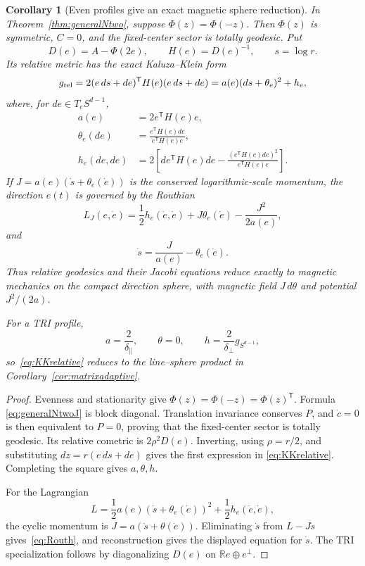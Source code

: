 \documentclass[11pt]{article}
\newtheorem{corollary}{Corollary}
\newcommand{\R}{\mathbb{R}}
\begin{document}
\begin{corollary}[Even profiles give an exact magnetic sphere reduction]
\label{cor:magneticreduction}
In Theorem~\ref{thm:generalNtwo}, suppose \(\Phi(z)=\Phi(-z)\).  Then
\(\Phi(z)\) is symmetric, \(C=0\), and the fixed-center sector is totally
geodesic.  Put
\[
 D(e)=A-\Phi(2e),\qquad H(e)=D(e)^{-1},\qquad s=\log r.
\]
Its relative metric has the exact Kaluza--Klein form
\begin{equation}
 g_{\rm rel}
 =2(e\,ds+de)^{\mathsf T}H(e)(e\,ds+de)
 =a(e)(ds+\theta_e)^2+h_e,
 \label{eq:KKrelative}
\end{equation}
where, for \(de\in T_eS^{d-1}\),
\[
\begin{aligned}
 a(e)&=2e^{\mathsf T}H(e)e,\\
 \theta_e(de)&=
 \frac{e^{\mathsf T}H(e)de}{e^{\mathsf T}H(e)e},\\
 h_e(de,de)&=2\left[
 de^{\mathsf T}H(e)de
 -\frac{(e^{\mathsf T}H(e)de)^2}{e^{\mathsf T}H(e)e}
 \right].
\end{aligned}
\]
If \(J=a(e)(\dot s+\theta_e(\dot e))\) is the conserved logarithmic-scale
momentum, the direction \(e(t)\) is governed by the Routhian
\begin{equation}
 L_J(e,\dot e)
 =\frac12h_e(\dot e,\dot e)
  +J\theta_e(\dot e)-\frac{J^2}{2a(e)},
 \label{eq:Routh}
\end{equation}
and
\[
 \dot s=\frac{J}{a(e)}-\theta_e(\dot e).
\]
Thus relative geodesics and their Jacobi equations reduce exactly to
magnetic mechanics on the compact direction sphere, with magnetic field
\(J\,d\theta\) and potential \(J^2/(2a)\).

For a TRI profile,
\[
 a=\frac2{\delta_\parallel},\qquad
 \theta=0,\qquad
 h=\frac2{\delta_\perp}g_{S^{d-1}},
\]
so~\eqref{eq:KKrelative} reduces to the line--sphere product in
Corollary~\ref{cor:matrixadaptive}.
\end{corollary}

\begin{proof}
Evenness and stationarity give
\(\Phi(z)=\Phi(-z)=\Phi(z)^{\mathsf T}\).  Formula
\eqref{eq:generalNtwoJ} is block diagonal.  Translation invariance conserves
\(P\), and \(\dot c=0\) is then equivalent to \(P=0\), proving that the
fixed-center sector is totally geodesic.  Its relative cometric is
\(2\rho^2D(e)\).  Inverting, using \(\rho=r/2\), and substituting
\(dz=r(e\,ds+de)\) gives the first expression in
\eqref{eq:KKrelative}.  Completing the square gives \(a,\theta,h\).

For the Lagrangian
\[
 L=\frac12a(e)(\dot s+\theta_e(\dot e))^2
   +\frac12h_e(\dot e,\dot e),
\]
the cyclic momentum is \(J=a(\dot s+\theta(\dot e))\).  Eliminating
\(\dot s\) from \(L-J\dot s\) gives~\eqref{eq:Routh}, and reconstruction
gives the displayed equation for \(\dot s\).  The TRI specialization follows
by diagonalizing \(D(e)\) on
\(\R e\oplus e^\perp\).
\end{proof}
\end{document}
